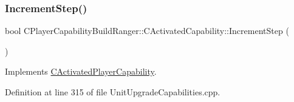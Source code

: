 \subsubsection{\texorpdfstring{Increment\+Step()}{IncrementStep()}}
{\footnotesize\ttfamily bool C\+Player\+Capability\+Build\+Ranger\+::\+C\+Activated\+Capability\+::\+Increment\+Step (\begin{DoxyParamCaption}{ }\end{DoxyParamCaption})\hspace{0.3cm}{\ttfamily [virtual]}}



Implements \hyperlink{classCActivatedPlayerCapability_a943b5999a57504399293250382c0ec6a}{C\+Activated\+Player\+Capability}.



Definition at line 315 of file Unit\+Upgrade\+Capabilities.\+cpp.


